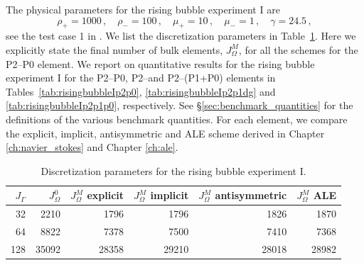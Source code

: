 The physical parameters for the rising bubble experiment I are
\begin{equation} \label{eq:Hysing1}
\rho_+ = 1000\,,\quad \rho_- = 100\,,\quad \mu_+ = 10\,,\quad \mu_- = 1\,,\quad
\gamma = 24.5\,,
\end{equation}
see the test case 1 in \cite[Table~I]{HysingTKPBGT09}. We list the
discretization parameters in Table~\ref{tab:risingbubble2Delements}. Here we
explicitly state the final number of bulk elements, $J_\Omega^M$, for all the
schemes for the P2--P0 element. We report on quantitative results for the
rising bubble experiment I for the P2--P0, P2--\pdg and P2--(P1+P0) elements in
Tables~\ref{tab:risingbubbleIp2p0}, \ref{tab:risingbubbleIp2p1dg} and
\ref{tab:risingbubbleIp2p1p0}, respectively. See
\S\ref{sec:benchmark_quantities} for the definitions of the various benchmark
quantities. For each element, we compare the explicit, implicit, antisymmetric
and ALE scheme derived in Chapter \ref{ch:navier_stokes} and Chapter
\ref{ch:ale}.
\begin{table}
\center
\begin{tabular}{rrrrrr}
\hline
$J_\Gamma$ & $J_\Omega^0$ & $J_\Omega^M$ explicit & $J_\Omega^M$ implicit &
$J_\Omega^M$ antisymmetric & $J_\Omega^M$ ALE \\
\hline
 32 &  2210 &  1796 &  1796 &  1826 &  1870 \\
 64 &  8822 &  7378 &  7500 &  7410 &  7368 \\
128 & 35092 & 28358 & 29210 & 28018 & 28982 \\
\hline
\end{tabular}
\caption[Navier--Stokes rising bubble I meshes parameters]
{Discretization parameters for the rising bubble experiment I.}
\label{tab:risingbubble2Delements}
\end{table}

